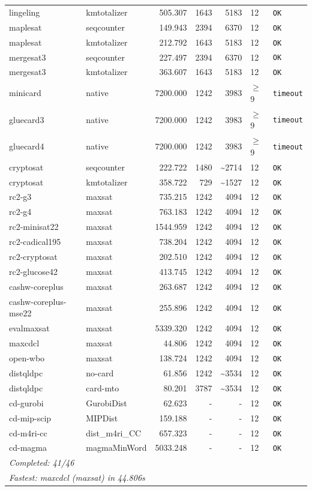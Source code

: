\begin{longtable}{llrrrl p{}}
lingeling & kmtotalizer & 505.307 & 1643 & 5183 & 12 & \texttt{OK} \\
maplesat & seqcounter & 149.943 & 2394 & 6370 & 12 & \texttt{OK} \\
maplesat & kmtotalizer & 212.792 & 1643 & 5183 & 12 & \texttt{OK} \\
mergesat3 & seqcounter & 227.497 & 2394 & 6370 & 12 & \texttt{OK} \\
mergesat3 & kmtotalizer & 363.607 & 1643 & 5183 & 12 & \texttt{OK} \\
minicard & native & 7200.000 & 1242 & 3983 & $\geq$9 & \texttt{timeout} \\
gluecard3 & native & 7200.000 & 1242 & 3983 & $\geq$9 & \texttt{timeout} \\
gluecard4 & native & 7200.000 & 1242 & 3983 & $\geq$9 & \texttt{timeout} \\
cryptosat & seqcounter & 222.722 & 1480 & \textasciitilde{}2714 & 12 & \texttt{OK} \\
cryptosat & kmtotalizer & 358.722 & 729 & \textasciitilde{}1527 & 12 & \texttt{OK} \\
rc2-g3 & maxsat & 735.215 & 1242 & 4094 & 12 & \texttt{OK} \\
rc2-g4 & maxsat & 763.183 & 1242 & 4094 & 12 & \texttt{OK} \\
rc2-minisat22 & maxsat & 1544.959 & 1242 & 4094 & 12 & \texttt{OK} \\
rc2-cadical195 & maxsat & 738.204 & 1242 & 4094 & 12 & \texttt{OK} \\
rc2-cryptosat & maxsat & 202.510 & 1242 & 4094 & 12 & \texttt{OK} \\
rc2-glucose42 & maxsat & 413.745 & 1242 & 4094 & 12 & \texttt{OK} \\
cashw-coreplus & maxsat & 263.687 & 1242 & 4094 & 12 & \texttt{OK} \\
cashw-coreplus-mse22 & maxsat & 255.896 & 1242 & 4094 & 12 & \texttt{OK} \\
evalmaxsat & maxsat & 5339.320 & 1242 & 4094 & 12 & \texttt{OK} \\
maxcdcl & maxsat & 44.806 & 1242 & 4094 & 12 & \texttt{OK} \\
open-wbo & maxsat & 138.724 & 1242 & 4094 & 12 & \texttt{OK} \\
distqldpc & no-card & 61.856 & 1242 & \textasciitilde{}3534 & 12 & \texttt{OK} \\
distqldpc & card-mto & 80.201 & 3787 & \textasciitilde{}3534 & 12 & \texttt{OK} \\
cd-gurobi & GurobiDist & 62.623 & - & - & 12 & \texttt{OK} \\
cd-mip-scip & MIPDist & 159.188 & - & - & 12 & \texttt{OK} \\
cd-m4ri-cc & dist\_m4ri\_CC & 657.323 & - & - & 12 & \texttt{OK} \\
cd-magma & magmaMinWord & 5033.248 & - & - & 12 & \texttt{OK} \\
\midrule
\multicolumn{7}{l}{\textit{Completed: 41/46}} \\
\multicolumn{7}{l}{\textit{Fastest: maxcdcl (maxsat) in 44.806s}} \\
\end{longtable}
